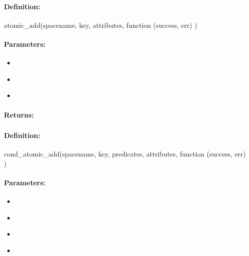 \paragraph{Definition:}
\begin{javascriptcode}
atomic_add(spacename, key, attributes, function (success, err) {})
\end{javascriptcode}
\paragraph{Parameters:}
\begin{itemize}[noitemsep]
\item {}\\

\item {}\\

\item {}\\

\end{itemize}

\paragraph{Returns:}


\pagebreak
\subsubsection{}
\label{api:nodejs:cond_atomic_add}


\paragraph{Definition:}
\begin{javascriptcode}
cond_atomic_add(spacename, key, predicates, attributes, function (success, err) {})
\end{javascriptcode}
\paragraph{Parameters:}
\begin{itemize}[noitemsep]
\item {}\\

\item {}\\

\item {}\\

\item {}\\

\end{itemize}


